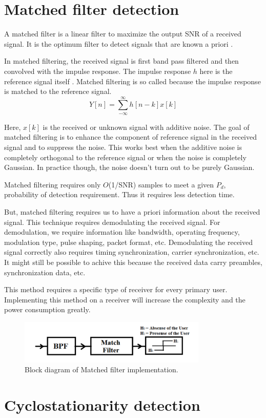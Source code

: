 \section{Matched filter detection}
A matched filter is a linear filter to maximize the output SNR of a received 
signal. It is the optimum filter to detect signals that are known a priori 
\cite{wikiMF}.


In matched filtering, the received signal is first band pass filtered and then
convolved with the impulse response. The impulse response $h$ here is the 
reference signal itself \cite{bhatta11}. Matched filtering is so called 
because the impulse response is matched to the reference signal.
\begin{equation*}
    Y[n] = \sum_{-\infty}^{\infty} h[n-k]x[k]
\end{equation*}

Here, $x[k]$ is the received or unknown signal with additive noise.
The goal of matched filtering is to enhance the component of reference signal
in the received signal and to suppress the noise. This works best when the 
additive noise is completely orthogonal to the reference signal or when the
noise is completely Gaussian. In practice though, the noise doesn't turn out 
to be purely Gaussian.
 
Matched filtering requires only $O$(1/SNR) samples to meet a given $P_d$, 
probability of detection requirement. Thus it requires less detection time.

But, matched filtering requires us to have a priori information about the 
received signal. This technique requires demodulating the received signal. For
demodulation, we require information like bandwidth, operating frequency, 
modulation type, pulse shaping, packet format, etc. Demodulating the received
signal correctly also requires timing synchronization, carrier 
synchronization, etc. It might still be possible to achive this because the
received data carry preambles, synchronization data, etc.

This method requires a specific type of receiver for every primary user.
Implementing this method on a receiver will increase the complexity and the 
power consumption greatly.

\begin{figure}
\centering
\includegraphics[width=0.8\textwidth]{matchedFilter}
\caption[Matched filter]{Block diagram of Matched filter implementation.}
\label{matchedFilter}
\end{figure}

\section{Cyclostationarity detection}


